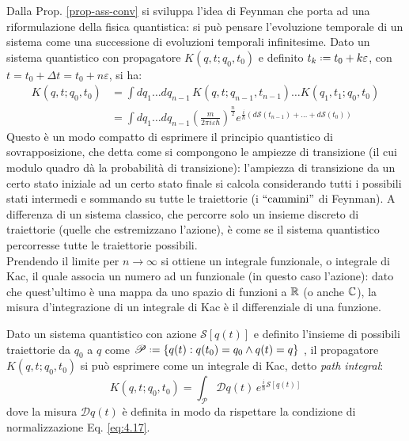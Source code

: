 Dalla Prop. \ref{prop-ass-conv} si sviluppa l'idea di Feynman che porta ad una riformulazione della fisica quantistica: si può pensare l'evoluzione temporale di un sistema come una successione di evoluzioni temporali infinitesime. Dato un sistema quantistico con propagatore $ K(q,t ; q_0,t_0) $ e definito $ t_k \defeq t_0 + k \varepsilon $, con $ t = t_0 + \Delta t = t_0 + n \varepsilon $, si ha:
\begin{equation*}
	\begin{split}
		K(q,t ; q_0,t_0)
		&= \int dq_1 \dots dq_{n-1}\, K(q,t ; q_{n-1},t_{n-1}) \dots K(q_1,t_1 ; q_0,t_0) \\
		&= \int dq_1 \dots dq_{n-1} \left( \frac{m}{2\pi i \varepsilon \hbar} \right)^{\frac{n}{2}} e^{\frac{i}{\hbar} ( d\mathcal{S}(t_{n-1}) + \dots + d\mathcal{S}(t_0) )}
	\end{split}
\end{equation*}
Questo è un modo compatto di esprimere il principio quantistico di sovrapposizione, che detta come si compongono le ampiezze di transizione (il cui modulo quadro dà la probabilità di transizione): l'ampiezza di transizione da un certo stato iniziale ad un certo stato finale si calcola considerando tutti i possibili stati intermedi e sommando su tutte le traiettorie (i $ ``\text{cammini}" $ di Feynman). A differenza di un sistema classico, che percorre solo un insieme discreto di traiettorie (quelle che estremizzano l'azione), è come se il sistema quantistico percorresse tutte le traiettorie possibili.\\
Prendendo il limite per $ n \rightarrow \infty $ si ottiene un integrale funzionale, o integrale di Kac, il quale associa un numero ad un funzionale (in questo caso l'azione): dato che quest'ultimo è una mappa da uno spazio di funzioni a $ \mathbb{R} $ (o anche $ \mathbb{C} $), la misura d'integrazione di un integrale di Kac è il differenziale di una funzione.

\begin{proposition}
	Dato un sistema quantistico con azione $ \mathcal{S}[q(t)] $ e definito l'insieme di possibili traiettorie da $ q_0 $ a $ q $ come $ \mathscr{P} \defeq \{q(t) : q(t_0) = q_0 \land q(t) = q\} $ , il propagatore $ K(q,t ; q_0,t_0) $ si può esprimere come un integrale di Kac, detto \textit{path integral}:
	\begin{equation}
		K(q,t ; q_0,t_0) = \int_{\mathscr{P}} \mathcal{D}q(t)\, e^{\frac{i}{\hbar} \mathcal{S}[q(t)]}
		\label{eq:4.18}
	\end{equation}
	dove la misura $ \mathcal{D}q(t) $ è definita in modo da rispettare la condizione di normalizzazione Eq. \ref{eq:4.17}.
\end{proposition}

